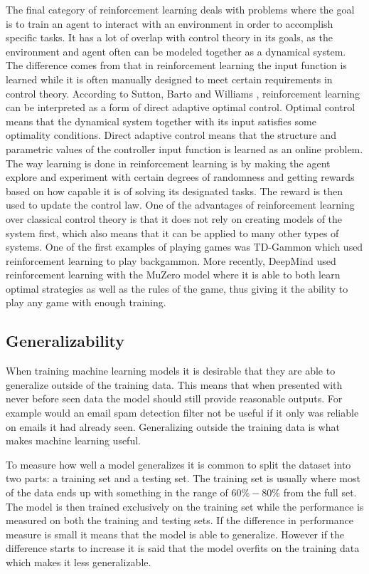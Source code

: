 The final category of reinforcement learning deals with problems where the goal is to train an agent to interact with an environment in order to accomplish specific tasks. It has a lot of overlap with control theory in its goals, as the environment and agent often can be modeled together as a dynamical system. The difference comes from that in reinforcement learning the input function is learned while it is often manually designed to meet certain requirements in control theory. According to Sutton, Barto and Williams \cite{rladaptivecontrol}, reinforcement learning can be interpreted as a form of direct adaptive optimal control. Optimal control means that the dynamical system together with its input satisfies some optimality conditions. Direct adaptive control means that the structure and parametric values of the controller input function is learned as an online problem. The way learning is done in reinforcement learning is by making the agent explore and experiment with certain degrees of randomness and getting rewards based on how capable it is of solving its designated tasks. The reward is then used to update the control law. One of the advantages of reinforcement learning over classical control theory is that it does not rely on creating models of the system first, which also means that it can be applied to many other types of systems. One of the first examples of playing games was TD-Gammon \cite{tdgammon} which used reinforcement learning to play backgammon. More recently, DeepMind used reinforcement learning with the MuZero model \cite{muzero} where it is able to both learn optimal strategies as well as the rules of the game, thus giving it the ability to play any game with enough training.

\subsection{Generalizability}

When training machine learning models it is desirable that they are able to generalize outside of the training data. This means that when presented with never before seen data the model should still provide reasonable outputs. For example would an email spam detection filter not be useful if it only was reliable on emails it had already seen. Generalizing outside the training data is what makes machine learning useful.

To measure how well a model generalizes it is common to split the dataset into two parts: a training set and a testing set. The training set is usually where most of the data ends up with something in the range of $60\%-80\%$ from the full set. The model is then trained exclusively on the training set while the performance is measured on both the training and testing sets. If the difference in performance measure is small it means that the model is able to generalize. However if the difference starts to increase it is said that the model overfits on the training data which makes it less generalizable.

